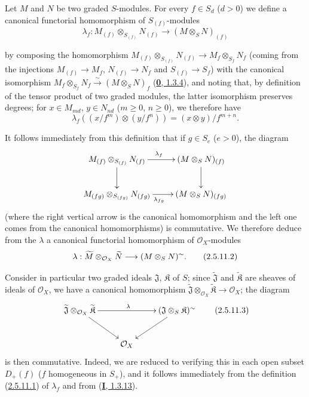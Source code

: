\begin{env}[2.5.11]
\label{II.2.5.11}
Let $M$ and $N$ be two graded $S$-modules. For every $f\in S_d$ ($d>0$)
we define a canonical functorial homomorphism of $S_{(f)}$-modules
\[
\label{II.2.5.11.1}
  \lambda_f:M_{(f)}\otimes_{S_{(f)}}N_{(f)}
  \longrightarrow(M\otimes_S N)_{(f)}
\tag{2.5.11.1}
\]

by composing the homomorphism
$M_{(f)}\otimes_{S_{(f)}}N_{(f)}\to M_f\otimes_{S_f}N_f$
(coming from the injections $M_{(f)}\to M_f$, $N_{(f)}\to N_f$ and
$S_{(f)}\to S_f$) with the canonical isomorphism
$M_f\otimes_{S_f}N_f\xrightarrow{\sim}(M\otimes_S N)_f$
(\hyperref[0.1.3.4]{\textbf{0}, 1.3.4}), and noting that, by definition of the
tensor product of two graded modules, the latter isomorphism preserves
degrees; for $x\in M_{md}$, $y\in N_{nd}$ ($m\geq0$, $n\geq0$), we
therefore have
\[
  \lambda_f((x/f^m)\otimes(y/f^n))=(x\otimes y)/f^{m+n}.
\]

It follows immediately from this definition that if $g\in S_e$ ($e>0$), the
diagram
\[
  \xymatrix{
    M_{(f)}\otimes_{S_{(f)}}N_{(f)}\ar[r]^{\lambda_f}\ar[d]
    & (M\otimes_S N)_{(f)}\ar[d]\\
    M_{(fg)}\otimes_{S_{(fg)}}N_{(fg)}\ar[r]_{\lambda_{fg}}
    & (M\otimes_S N)_{(fg)}
  }
\]
(where the right vertical arrow is the canonical homomorphism and the left
one comes from the canonical homomorphisms) is commutative. We therefore
deduce from the $\lambda$ a canonical functorial homomorphism of
$\mathcal{O}_X$-modules
\[
\label{II.2.5.11.2}
  \lambda:\widetilde{M}\otimes_{\mathcal{O}_X}\widetilde{N}
  \longrightarrow(M\otimes_S N)^{\sim}.
\tag{2.5.11.2}
\]

Consider in particular two graded ideals $\mathfrak{J}$,
$\mathfrak{K}$ of $S$; since $\widetilde{\mathfrak{J}}$ and
$\widetilde{\mathfrak{K}}$ are sheaves of ideals of
$\mathcal{O}_X$, we have a canonical homomorphism
$\widetilde{\mathfrak{J}}\otimes_{\mathcal{O}_X}
\widetilde{\mathfrak{K}}\to\mathcal{O}_X$; the diagram
\[
\label{II.2.5.11.3}
  \xymatrix{
    \widetilde{\mathfrak{J}}\otimes_{\mathcal{O}_X}
    \widetilde{\mathfrak{K}}\ar[rr]^\lambda\ar[dr]
    && (\mathfrak{J}\otimes_S\mathfrak{K})\supertilde\ar[dl]\\
    & \mathcal{O}_X &
  }
\tag{2.5.11.3}
\]
is then commutative. Indeed, we are reduced to verifying this in each
open subset $D_+(f)$ ($f$ homogeneous in $S_+$), and it follows immediately
from the definition (\hyperref[II.2.5.11.1]{2.5.11.1}) of $\lambda_f$ and
from (\hyperref[I.1.3.13]{\textbf{I}, 1.3.13}).


\end{env}
